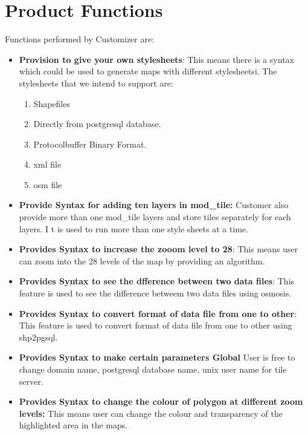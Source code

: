 \section{Product Functions}

Functions performed by Customizer are:
\begin{itemize}
    \item {\bf Provision to give your own stylesheets}: This means there is a syntax which could be used to generate maps with different stylesheetsi.
    The stylesheets that we intend to support are:
    \begin{enumerate}
        \item Shapefiles
        \item Directly from postgresql database.
        \item Protocolbuffer Binary Format.
        \item xml file
        \item osm file
       
    \end{enumerate}
   
    \item \textbf{Provide Syntax for adding ten layers in mod\_tile:}
    Customer also provide more than one mod\_tile layers and store tiles separately for each layers. I t is used to run more than one style sheets at a time.
   
   
    \item {\bf Provides Syntax to increase the zooom level to 28}:
    This means user can zoom into the 28 levels of the map by providing an algorithm.
   
    \item \textbf{Provides Syntax to see the dfference between two data files}:
    This feature is used to see the difference betweem two data files using osmosis.
   
    \item \textbf{Provides Syntax to convert format of data file from one to other}:
    This feature is used to convert format of data file from one to other using shp2pgsql.
   
    \item \textbf{Provides Syntax to make certain parameters Global}
    User is free to change domain name, postgresql database name, unix user name for tile server.

    \item \textbf{Provides Syntax to change the colour of polygon at different zoom levels:}
    This means user can change the colour and transparency of the highlighted area in the maps.


\end{itemize}
